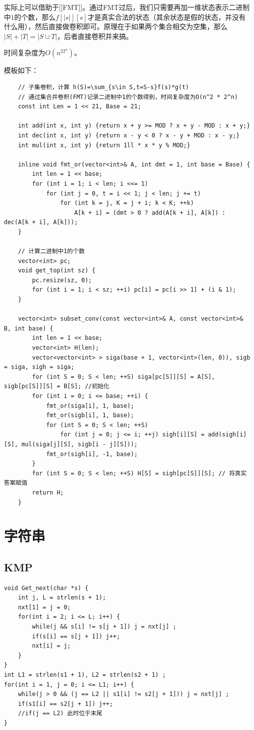 \documentclass[a4paper,11pt,twoside,fontset = fandol,UTF8]{ctexbook} %
\begin{document}
	实际上可以借助于[[FMT]]。通过FMT过后，我们只需要再加一维状态表示二进制中$1$的个数，那么$f[|s|][s]$才是真实合法的状态（其余状态是假的状态，并没有什么用），然后直接做卷积即可。原理在于如果两个集合相交为空集，那么$|S|+|T|=|S\cup T|$，后者直接卷积并来搞。
	
	时间复杂度为$O(n^22^n)$。
	
	模板如下：
	
	\begin{lstlisting}
	// 子集卷积，计算 h(S)=\sum_{s\in S,t=S-s}f(s)*g(t)
	// 通过集合并卷积(FMT)记录二进制中1的个数得到，时间复杂度为O(n^2 * 2^n)
	const int Len = 1 << 21, Base = 21;
	
	int add(int x, int y) {return x + y >= MOD ? x + y - MOD : x + y;}
	int dec(int x, int y) {return x - y < 0 ? x - y + MOD : x - y;}
	int mul(int x, int y) {return 1ll * x * y % MOD;}
	
	inline void fmt_or(vector<int>& A, int dmt = 1, int base = Base) {
	    int len = 1 << base;
	    for (int i = 1; i < len; i <<= 1)
	        for (int j = 0, t = i << 1; j < len; j += t)
	            for (int k = j, K = j + i; k < K; ++k) 
	                A[k + i] = (dmt > 0 ? add(A[k + i], A[k]) : dec(A[k + i], A[k]));
	}
	
	// 计算二进制中1的个数
	vector<int> pc;
	void get_top(int sz) {
	    pc.resize(sz, 0);
	    for (int i = 1; i < sz; ++i) pc[i] = pc[i >> 1] + (i & 1);
	}
	
	vector<int> subset_conv(const vector<int>& A, const vector<int>& B, int base) {
	    int len = 1 << base;
	    vector<int> H(len);
	    vector<vector<int> > siga(base + 1, vector<int>(len, 0)), sigb = siga, sigh = siga;
	    for (int S = 0; S < len; ++S) siga[pc[S]][S] = A[S], sigb[pc[S]][S] = B[S]; //初始化
	    for (int i = 0; i <= base; ++i) {
	        fmt_or(siga[i], 1, base);
	        fmt_or(sigb[i], 1, base);
	        for (int S = 0; S < len; ++S)
	            for (int j = 0; j <= i; ++j) sigh[i][S] = add(sigh[i][S], mul(siga[j][S], sigb[i - j][S]));
	        fmt_or(sigh[i], -1, base);
	    }
	    for (int S = 0; S < len; ++S) H[S] = sigh[pc[S]][S]; // 将真实答案赋值
	    return H;
	}
	\end{lstlisting}
	
	\chapter{字符串}
	\section{KMP}
	\begin{lstlisting}
void Get_next(char *s) {
    int j, L = strlen(s + 1);
    nxt[1] = j = 0;
    for(int i = 2; i <= L; i++) {
        while(j && s[i] != s[j + 1]) j = nxt[j] ;
        if(s[i] == s[j + 1]) j++;
        nxt[i] = j;
    }
}
int L1 = strlen(s1 + 1), L2 = strlen(s2 + 1) ;
for(int i = 1, j = 0; i <= L1; i++) {
    while(j > 0 && (j == L2 || s1[i] != s2[j + 1])) j = nxt[j] ;
    if(s1[i] == s2[j + 1]) j++;
    //if(j == L2) 此时位于末尾 
}
	\end{lstlisting}
\end{document}
